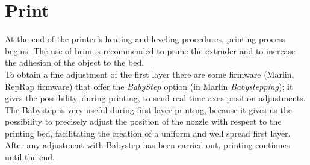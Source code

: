 \section{Print}
At the end of the printer's heating and leveling procedures, printing process begins. The use of brim is recommended to prime the extruder and to increase the adhesion of the object to the bed.\\
To obtain a fine adjustment of the first layer there are some firmware (Marlin, RepRap firmware) that offer the \emph{BabyStep} option (in Marlin \emph{Babystepping}); it gives the possibility, during printing, to send real time axes position adjustments. The Babystep is very useful during first layer printing, because it gives us the possibility to precisely adjust the position of the nozzle with respect to the printing bed, facilitating the creation of a uniform and well spread first layer. After any adjustment with Babystep has been carried out, printing continues until the end.
